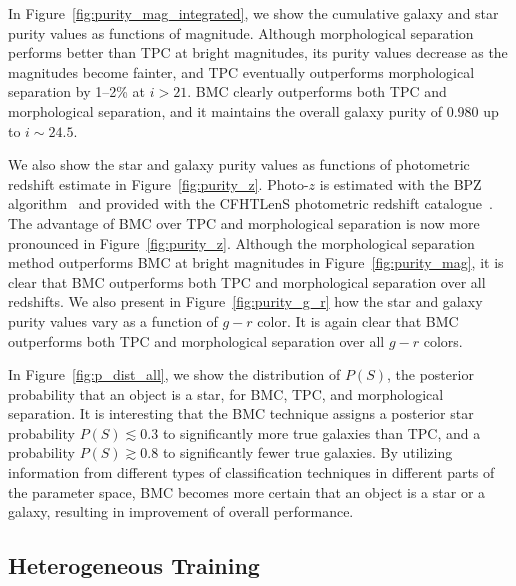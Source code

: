 In Figure~\ref{fig:purity_mag_integrated}, we show the
cumulative galaxy and star purity values as functions of magnitude.
Although morphological separation performs better than TPC
at bright magnitudes, its purity values decrease as 
the magnitudes become fainter, and
TPC eventually outperforms morphological separation by 1--2\% at
$i > 21$.
BMC clearly outperforms both TPC and morphological separation,
and it maintains the overall galaxy purity of 0.980
up to $i \sim 24.5$.



We also show the star and galaxy purity values as functions of
photometric redshift estimate in Figure~\ref{fig:purity_z}.
Photo-$z$ is estimated with
the \textsc{BPZ} algorithm~\citep{benitez2000bayesian}
and provided with
the CFHTLenS photometric redshift catalogue~\citep{hildebrandt2012cfhtlens}.
The advantage of BMC over TPC and morphological separation is
now more pronounced in Figure~\ref{fig:purity_z}.
Although the morphological separation method outperforms BMC
at bright magnitudes in Figure~\ref{fig:purity_mag},
it is clear that BMC outperforms
both TPC and morphological separation over all redshifts.
We also present in Figure~\ref{fig:purity_g_r}
how the star and galaxy purity values vary
as a function of $g-r$ color.
It is again clear that BMC outperforms
both TPC and morphological separation over all $g-r$ colors.



In Figure~\ref{fig:p_dist_all},
we show the distribution of $P(S)$,
the posterior probability that an object is a star,
for BMC, TPC, and morphological separation.
It is interesting that the BMC technique assigns
a posterior star probability $P(S) \lesssim 0.3$
to significantly more true galaxies than TPC,
and a probability $P(S) \gtrsim 0.8$ to significantly fewer true galaxies.
By utilizing information from different types of classification techniques
in different parts of the parameter space,
BMC becomes more certain that an object is a star or a galaxy,
resulting in improvement of overall performance.


\subsection{Heterogeneous Training}
  \label{section:poor_training}
 
